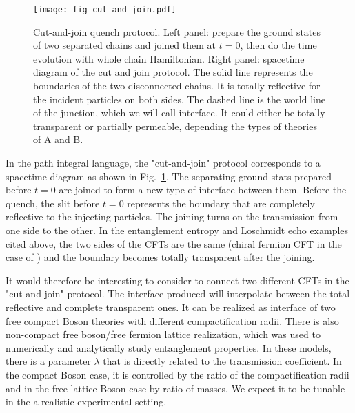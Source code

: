 \begin{figure}[htb]
\centering
\texttt{[image: fig\_cut\_and\_join.pdf]}
\caption{Cut-and-join quench protocol. Left panel: prepare the ground states of two separated chains and joined them at $t = 0$, then do the time evolution with whole chain Hamiltonian. Right panel: spacetime diagram of the cut and join protocol. The solid line represents the boundaries of the two disconnected chains. It is totally reflective for the incident particles on both sides. The dashed line is the world line of the junction, which we will call interface. It could either be totally transparent or partially permeable, depending the types of theories of A and B.}
\label{fig:cut-and-join}
\end{figure}

In the path integral language, the "cut-and-join" protocol corresponds to a spacetime diagram as shown in Fig.~\ref{fig:cut-and-join}. The separating ground stats prepared before $t = 0$ are joined to form a new type of interface between them. Before the quench, the slit before $t = 0$ represents the boundary that are completely reflective to the injecting particles. The joining turns on the transmission from one side to the other. In the entanglement entropy and Loschmidt echo examples cited above\cite{calabrese_entanglement_2007, calabrese_quantum_2016, vasseur_universal_2014}, the two sides of the CFTs are the same (chiral fermion CFT in the case of ) and the boundary becomes totally transparent after the joining. 

It would therefore be interesting to consider to connect two different CFTs in the "cut-and-join" protocol. The interface produced will interpolate between the total reflective and complete transparent ones. It can be realized as interface of two free compact Boson theories with different compactification radii\cite{bachas_permeable_2002}. There is also non-compact free boson/free fermion lattice realization, which was used to numerically and analytically\cite{peschel_exact_2012,sakai_entanglement_2008} study entanglement properties. In these models, there is a parameter $\lambda$ that is directly related to the transmission coefficient. In the compact Boson case, it is controlled by the ratio of the compactification radii and in the free lattice Boson case by ratio of masses. We expect it to be tunable in the a realistic experimental setting.

